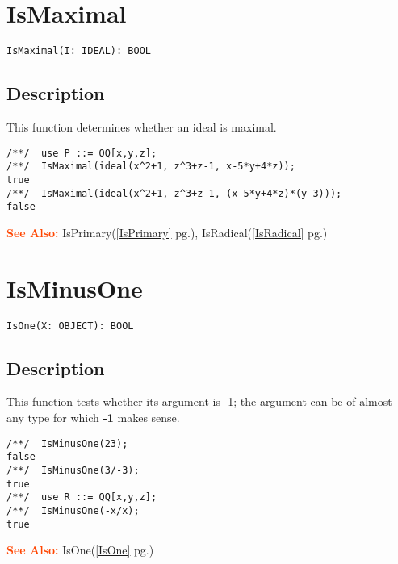 \documentclass[a4paper]{mybook}
\newenvironment{command}{}{} %
\newcommand\SeeAlso{\par\textcolor{OrangeRed}{\textbf{\large See Also: }}}
\begin{document}
\section{IsMaximal}
\label{IsMaximal}
\begin{command} %


\begin{Verbatim}[label=syntax, rulecolor=\color{MidnightBlue},
frame=single]
IsMaximal(I: IDEAL): BOOL
\end{Verbatim}


\subsection*{Description}

This function determines whether an ideal is maximal.
\begin{Verbatim}[label=example, rulecolor=\color{PineGreen}, frame=single]
/**/  use P ::= QQ[x,y,z];
/**/  IsMaximal(ideal(x^2+1, z^3+z-1, x-5*y+4*z));
true 
/**/  IsMaximal(ideal(x^2+1, z^3+z-1, (x-5*y+4*z)*(y-3)));
false
\end{Verbatim}


\SeeAlso %
  IsPrimary(\ref{IsPrimary} pg.\pageref{IsPrimary}), 
    IsRadical(\ref{IsRadical} pg.\pageref{IsRadical})
\end{command} %

\section{IsMinusOne}
\label{IsMinusOne}
\begin{command} %


\begin{Verbatim}[label=syntax, rulecolor=\color{MidnightBlue},
frame=single]
IsOne(X: OBJECT): BOOL
\end{Verbatim}


\subsection*{Description}

This function tests whether its argument is -1; the argument can be
of almost any type for which \textbf{-1} makes sense.
\begin{Verbatim}[label=example, rulecolor=\color{PineGreen}, frame=single]
/**/  IsMinusOne(23);
false
/**/  IsMinusOne(3/-3);
true
/**/  use R ::= QQ[x,y,z];
/**/  IsMinusOne(-x/x);
true
\end{Verbatim}


\SeeAlso %
  IsOne(\ref{IsOne} pg.\pageref{IsOne})
\end{command} %
\end{document}
